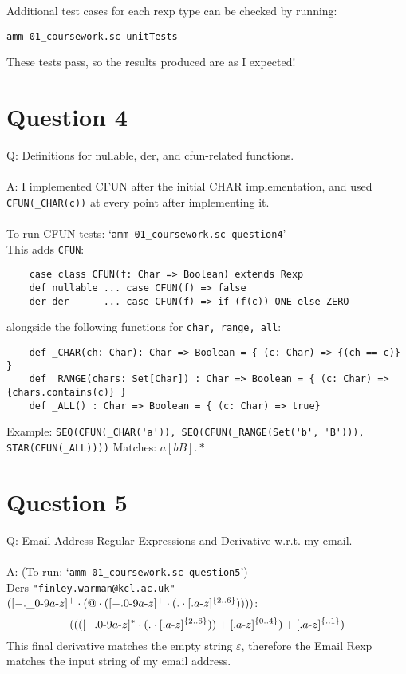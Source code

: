\documentclass[english]{scrartcl}
\begin{document}
Additional test cases for each rexp type can be checked by running:
\begin{center}
    \verb|amm 01_coursework.sc unitTests|
\end{center}

These tests pass, so the results produced are as I expected!

\section*{Question 4}
Q: Definitions for nullable, der, and cfun-related functions.
\\
\\
A: I implemented CFUN after the initial CHAR implementation, and used \verb|CFUN(_CHAR(c))| at every point after implementing it.\\
\\
To run CFUN tests: `\verb|amm 01_coursework.sc question4|' \\
This adds \verb|CFUN|:
\begin{verbatim}
    case class CFUN(f: Char => Boolean) extends Rexp
    def nullable ... case CFUN(f) => false
    der der      ... case CFUN(f) => if (f(c)) ONE else ZERO
\end{verbatim}
alongside the following functions for \verb|char, range, all|:
\begin{verbatim}
    def _CHAR(ch: Char): Char => Boolean = { (c: Char) => {(ch == c)} }
    def _RANGE(chars: Set[Char]) : Char => Boolean = { (c: Char) => {chars.contains(c)} }
    def _ALL() : Char => Boolean = { (c: Char) => true}
\end{verbatim}
Example: \verb|SEQ(CFUN(_CHAR('a')), SEQ(CFUN(_RANGE(Set('b', 'B'))), STAR(CFUN(_ALL))))| Matches: $a[bB].*$

\section*{Question 5}
Q: Email Address Regular Expressions and Derivative w.r.t. my email.
\\
\\
A: (To run: `\verb|amm 01_coursework.sc question5|') \\
Ders \verb~"finley.warman@kcl.ac.uk" ~$([-.\_0{\text -}9a{\text -}z]^+\cdot(@\cdot([-.0{\text -}9a{\text -}z]^+\cdot(.\cdot[.a{\text -}z]^{\{2..6\}}))))$:
\[
    ((([-.0{\text -}9a{\text -}z]^* \cdot (. \cdot [.a{\text -}z]^{\{2..6\}})) + [.a{\text -}z]^{\{0..4\}}) + [.a{\text -}z]^{\{..1\}})
\]
This final derivative matches the empty string $\varepsilon$, therefore the Email Rexp matches the input string of my email address.
\end{document}
